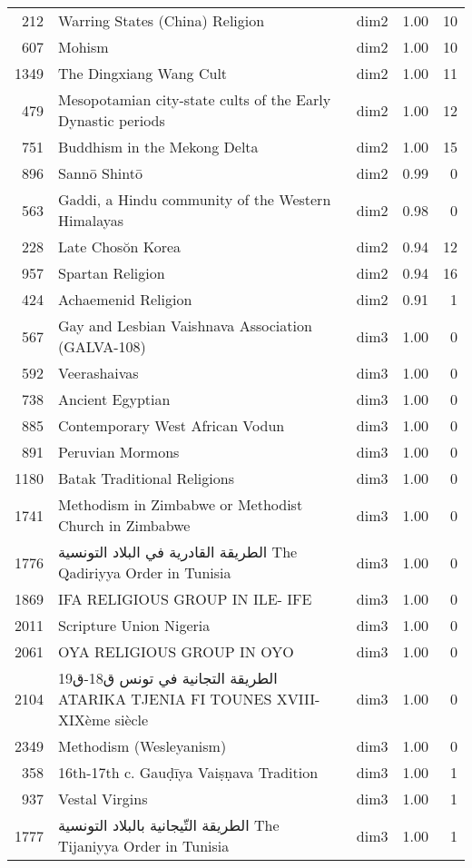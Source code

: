 \begin{tabular}{rllrr}
212 & Warring States (China) Religion & dim2 & 1.00 & 10 \\
607 & Mohism & dim2 & 1.00 & 10 \\
1349 & The Dingxiang Wang Cult & dim2 & 1.00 & 11 \\
479 & Mesopotamian city-state cults of the Early Dynastic periods & dim2 & 1.00 & 12 \\
751 & Buddhism in the Mekong Delta & dim2 & 1.00 & 15 \\
896 & Sannō Shintō & dim2 & 0.99 & 0 \\
563 & Gaddi, a Hindu community of the Western Himalayas & dim2 & 0.98 & 0 \\
228 & Late Chosŏn Korea & dim2 & 0.94 & 12 \\
957 & Spartan Religion & dim2 & 0.94 & 16 \\
424 & Achaemenid Religion & dim2 & 0.91 & 1 \\
567 & Gay and Lesbian Vaishnava Association (GALVA-108) & dim3 & 1.00 & 0 \\
592 & Veerashaivas & dim3 & 1.00 & 0 \\
738 & Ancient Egyptian & dim3 & 1.00 & 0 \\
885 & Contemporary West African Vodun & dim3 & 1.00 & 0 \\
891 & Peruvian Mormons & dim3 & 1.00 & 0 \\
1180 & Batak Traditional Religions & dim3 & 1.00 & 0 \\
1741 & Methodism in Zimbabwe or Methodist Church in Zimbabwe & dim3 & 1.00 & 0 \\
1776 & الطريقة القادرية في البلاد التونسية The Qadiriyya Order in Tunisia & dim3 & 1.00 & 0 \\
1869 & IFA RELIGIOUS GROUP IN ILE- IFE & dim3 & 1.00 & 0 \\
2011 & Scripture Union Nigeria & dim3 & 1.00 & 0 \\
2061 & OYA RELIGIOUS GROUP IN OYO & dim3 & 1.00 & 0 \\
2104 & الطريقة التجانية في تونس ق18-ق19 ATARIKA TJENIA FI TOUNES  XVIII-XIXème siècle & dim3 & 1.00 & 0 \\
2349 & Methodism (Wesleyanism) & dim3 & 1.00 & 0 \\
358 & 16th-17th c. Gauḍīya Vaiṣṇava Tradition & dim3 & 1.00 & 1 \\
937 & Vestal Virgins & dim3 & 1.00 & 1 \\
1777 & الطريقة التّيجانية بالبلاد التونسية The Tijaniyya Order in Tunisia & dim3 & 1.00 & 1 \\

\end{tabular}
